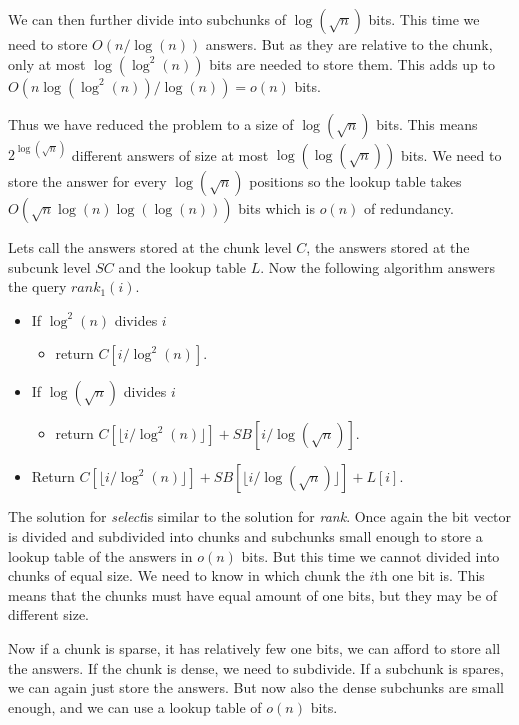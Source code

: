 \documentclass[11pt]{article}
\newcommand{\bigo}{O}
\newcommand{\smallo}{o}
\newcommand{\rank}{\textit{rank}}
\newcommand{\select}{\textit{select}}
\begin{document}
We can then further divide into subchunks of $\log(\sqrt{n})$ bits.
This time we need to store $\bigo(n / \log(n))$ answers. But as they
are relative to the chunk, only at most $\log(\log^2(n))$ bits are
needed to store them. This adds up to $\bigo(n\log(\log^2(n)) /
\log(n)) = \smallo(n)$ bits.

Thus we have reduced the problem to a size of $\log(\sqrt{n})$ bits.
This means $2^{\log(\sqrt{n})}$ different answers of size at most
$\log(\log(\sqrt{n}))$ bits. We need to store the answer for every
$\log(\sqrt{n})$ positions so the lookup table takes $\bigo(\sqrt{n}
\log(n) \log(\log(n)))$ bits which is $\smallo(n)$ of redundancy.

Lets call the answers stored at the chunk level $C$, the answers
stored at the subcunk level $SC$ and the lookup table $L$. Now the
following algorithm answers the query $\rank_1(i)$.

\begin{itemize}
\item If $\log^2(n)$ divides $i$
  \begin{itemize}
  \item return $C[i / \log^2(n)]$.
  \end{itemize}

\item If $\log(\sqrt{n})$ divides $i$
  \begin{itemize}
  \item return $C[\lfloor i / \log^2(n)\rfloor ] + SB[i /
    \log(\sqrt{n})]$.
  \end{itemize}

\item Return $C[\lfloor i / \log^2(n)\rfloor ] + SB[\lfloor i /
  \log(\sqrt{n}) \rfloor] + L[i]$.
\end{itemize}

The solution for \select is similar to the solution for \rank. Once
again the bit vector is divided and subdivided into chunks and
subchunks small enough to store a lookup table of the answers in
$\smallo(n)$ bits. But this time we cannot divided into chunks of
equal size. We need to know in which chunk the $i$th one bit is. This
means that the chunks must have equal amount of one bits, but they may
be of different size.

Now if a chunk is sparse, it has relatively few one bits, we can
afford to store all the answers. If the chunk is dense, we need to
subdivide. If a subchunk is spares, we can again just store the
answers. But now also the dense subchunks are small enough, and we can
use a lookup table of $\smallo(n)$ bits.
\end{document}

